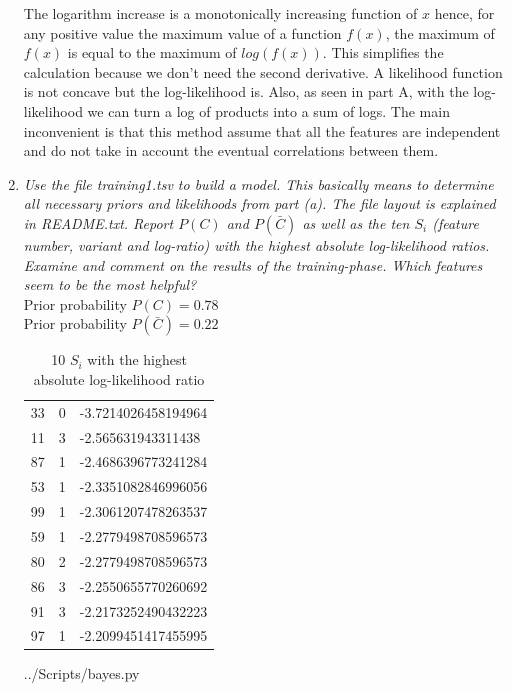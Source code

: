 \documentclass[10pt,a4paper]{article}
\begin{document}
\begin{enumerate}
The logarithm increase is a monotonically increasing function of $x$ hence, for any positive value the maximum value of a function $f(x)$, the maximum of $f(x)$ is equal to the maximum of $log(f(x))$. This simplifies the calculation because we don't need the second derivative. A likelihood function is not concave but the log-likelihood is. Also, as seen in part A, with the log-likelihood we can turn a log of products into a sum of logs. The main inconvenient is that this method assume that all the features are independent and do not take in account the eventual correlations between them. 




\newpage
\item \textit{Use the file training1.tsv to build a model. This basically means to determine all necessary
	priors and likelihoods from part (a). The file layout is explained in README.txt. Report
	$P(C)$ and $P(\bar{C})$ as well as the ten $S_i$ (feature number, variant and log-ratio) with the highest
	absolute log-likelihood ratios. Examine and comment on the results of the training-phase.
	Which features seem to be the most helpful?
}\\

Prior probability $P(C) = 0.78$\\
Prior probability $P(\bar{C}) = 0.22$\\

 



\begin{table}[H]
	\centering
	\caption{10 $S_i$ with the highest absolute log-likelihood ratio}
	\label{10most}
	\begin{tabular}{lll}
		33 & 0 & -3.7214026458194964 \\
		11 & 3 & -2.565631943311438  \\
		87 & 1 & -2.4686396773241284 \\
		53 & 1 & -2.3351082846996056 \\
		99 & 1 & -2.3061207478263537 \\
		59 & 1 & -2.2779498708596573 \\
		80 & 2 & -2.2779498708596573 \\
		86 & 3 & -2.2550655770260692 \\
		91 & 3 & -2.2173252490432223 \\
		97 & 1 & -2.2099451417455995
	\end{tabular}
\end{table}




 {../Scripts/bayes.py}


\end{enumerate}
\end{document}
